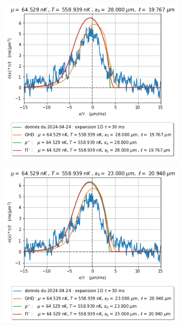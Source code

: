 \documentclass[a3, 10pt,twoside]{article}          %
\theoremstyle{plain}
\theoremstyle{definition}
\theoremstyle{remark}
\theoremstyle{definition} %
\begin{document}
\begin{figure}[H]
    \begin{subfigure}[b]{0.32\textwidth}
        \centering
        \includegraphics[width=\textwidth]{Figures/simul_expansion_30_expansion_28}
        \caption{}
        \label{}
    \end{subfigure}
    \hfill
    \begin{subfigure}[b]{0.32\textwidth}
        \centering
        \includegraphics[width=\textwidth]{Figures/simul_expansion_30_expansion_23}

\end{subfigure}
\end{figure}
\end{document}
